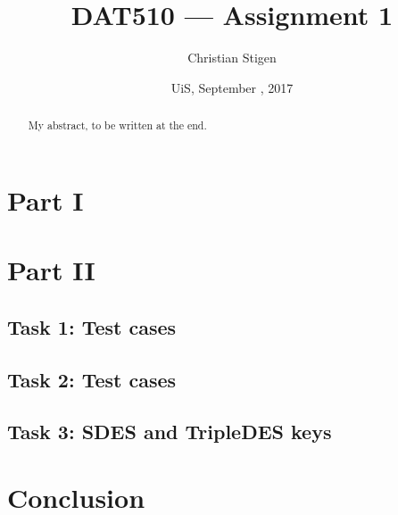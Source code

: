 \documentclass[a4paper,english,12pt]{article}
\title{DAT510 --- Assignment 1}
\author{Christian Stigen}
\date{UiS, September \nth{18}, 2017}
\begin{document}
\maketitle

\begin{abstract}
My abstract, to be written at the end.
\end{abstract}

\section{Part I}

\section{Part II}

\subsection{Task 1: Test cases}
\subsection{Task 2: Test cases}
\subsection{Task 3: SDES and TripleDES keys}

\section{Conclusion}



\end{document}
